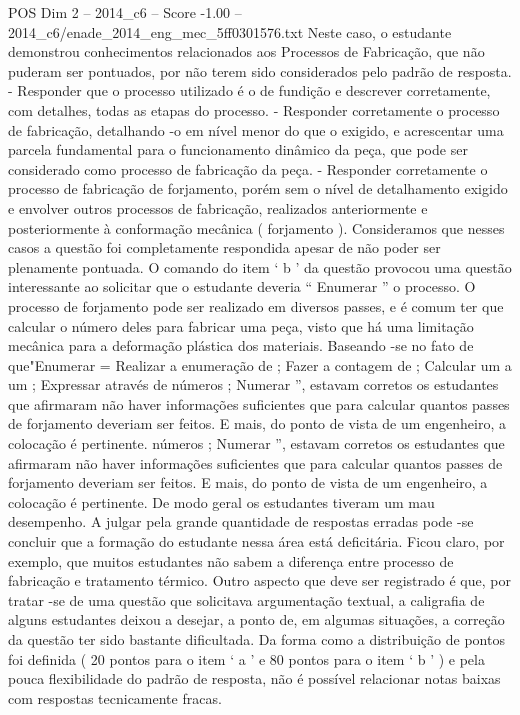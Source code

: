 \begin{textsample}{POS Dim 2 – 2014\_c6 – Score -1.00 – 2014\_c6/enade\_2014\_eng\_mec\_5ff0301576.txt}
Neste caso, o estudante demonstrou conhecimentos relacionados aos Processos de Fabricação, que não puderam ser pontuados, por não terem sido considerados pelo padrão de resposta. - Responder que o processo utilizado é o de fundição e descrever corretamente, com detalhes, todas as etapas do processo. - Responder corretamente o processo de fabricação, detalhando -o em nível menor do que o exigido, e acrescentar uma parcela fundamental para o funcionamento dinâmico da peça, que pode ser considerado como processo de fabricação da peça. - Responder corretamente o processo de fabricação de forjamento, porém sem o nível de detalhamento exigido e envolver outros processos de fabricação, realizados anteriormente e posteriormente à conformação mecânica ( forjamento ).
Consideramos que nesses casos a questão foi completamente respondida apesar de não poder ser plenamente pontuada.
O comando do item ‘ b ’ da questão provocou uma questão interessante ao solicitar que o estudante deveria “ Enumerar ” o processo.
O processo de forjamento pode ser realizado em diversos passes, e é comum ter que calcular o número deles para fabricar uma peça, visto que há uma limitação mecânica para a deformação plástica dos materiais.
Baseando -se no fato de que"Enumerar = Realizar a enumeração de ; Fazer a contagem de ; Calcular um a um ; Expressar através de números ; Numerar ”, estavam corretos os estudantes que afirmaram não haver informações suficientes que para calcular quantos passes de forjamento deveriam ser feitos.
E mais, do ponto de vista de um engenheiro, a colocação é pertinente. números ; Numerar ”, estavam corretos os estudantes que afirmaram não haver informações suficientes que para calcular quantos passes de forjamento deveriam ser feitos.
E mais, do ponto de vista de um engenheiro, a colocação é pertinente.
De modo geral os estudantes tiveram um mau desempenho.
A julgar pela grande quantidade de respostas erradas pode -se concluir que a formação do estudante nessa área está deficitária.
Ficou claro, por exemplo, que muitos estudantes não sabem a diferença entre processo de fabricação e tratamento térmico.
Outro aspecto que deve ser registrado é que, por tratar -se de uma questão que solicitava argumentação textual, a caligrafia de alguns estudantes deixou a desejar, a ponto de, em algumas situações, a correção da questão ter sido bastante dificultada.
Da forma como a distribuição de pontos foi definida ( 20 pontos para o item ‘ a ’ e 80 pontos para o item ‘ b ’ ) e pela pouca flexibilidade do padrão de resposta, não é possível relacionar notas baixas com respostas tecnicamente fracas.

\end{textsample}
